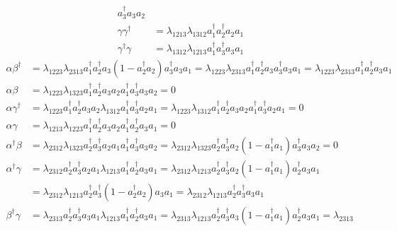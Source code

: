 \documentclass[aps,preprint]{revtex4}%
\begin{document}
\begin{itemize}
\begin{align}
a_{3}^{\dagger}a_{3}a_{2}\nonumber\\
\gamma\gamma^{\dagger}  &  =\lambda_{1213}\lambda_{1312}a_{1}^{\dagger}%
a_{2}^{\dagger}a_{2}a_{1}\nonumber\\
\gamma^{\dagger}\gamma &  =\lambda_{1312}\lambda_{1213}a_{1}^{\dagger}%
a_{3}^{\dagger}a_{3}a_{1}%
\end{align}%
\begin{align}
\alpha\beta^{\dagger}  &  =\lambda_{1223}\lambda_{2313}a_{1}^{\dagger}%
a_{2}^{\dagger}a_{3}\left(  1-a_{2}^{\dagger}a_{2}\right)  a_{3}^{\dagger
}a_{3}a_{1}=\lambda_{1223}\lambda_{2313}a_{1}^{\dagger}a_{2}^{\dagger}%
a_{3}a_{3}^{\dagger}a_{3}a_{1}=\lambda_{1223}\lambda_{2313}a_{1}^{\dagger
}a_{2}^{\dagger}a_{3}a_{1}\nonumber\\
\alpha\beta &  =\lambda_{1223}\lambda_{1323}a_{1}^{\dagger}a_{2}^{\dagger
}a_{3}a_{2}a_{1}^{\dagger}a_{3}^{\dagger}a_{3}a_{2}=0\nonumber\\
\alpha\gamma^{\dagger}  &  =\lambda_{1223}a_{1}^{\dagger}a_{2}^{\dagger}%
a_{3}a_{2}\lambda_{1312}a_{1}^{\dagger}a_{3}^{\dagger}a_{2}a_{1}%
=\lambda_{1223}\lambda_{1312}a_{1}^{\dagger}a_{2}^{\dagger}a_{3}a_{2}%
a_{1}^{\dagger}a_{3}^{\dagger}a_{2}a_{1}=0\nonumber\\
\alpha\gamma &  =\lambda_{1213}\lambda_{1223}a_{1}^{\dagger}a_{2}^{\dagger
}a_{3}a_{2}a_{1}^{\dagger}a_{2}^{\dagger}a_{3}a_{1}=0\nonumber\\
\alpha^{\dagger}\beta &  =\lambda_{2312}\lambda_{1323}a_{2}^{\dagger}%
a_{3}^{\dagger}a_{2}a_{1}a_{1}^{\dagger}a_{3}^{\dagger}a_{3}a_{2}%
=\lambda_{2312}\lambda_{1323}a_{2}^{\dagger}a_{3}^{\dagger}a_{2}\left(
1-a_{1}^{\dagger}a_{1}\right)  a_{3}^{\dagger}a_{3}a_{2}=0\nonumber\\
\alpha^{\dagger}\gamma &  =\lambda_{2312}a_{2}^{\dagger}a_{3}^{\dagger}%
a_{2}a_{1}\lambda_{1213}a_{1}^{\dagger}a_{2}^{\dagger}a_{3}a_{1}%
=\lambda_{2312}\lambda_{1213}a_{2}^{\dagger}a_{3}^{\dagger}a_{2}\left(
1-a_{1}^{\dagger}a_{1}\right)  a_{2}^{\dagger}a_{3}a_{1}\nonumber\\
&  =\lambda_{2312}\lambda_{1213}a_{2}^{\dagger}a_{3}^{\dagger}\left(
1-a_{2}^{\dagger}a_{2}\right)  a_{3}a_{1}=\lambda_{2312}\lambda_{1213}%
a_{2}^{\dagger}a_{3}^{\dagger}a_{3}a_{1}\\
\beta^{\dagger}\gamma &  =\lambda_{2313}a_{2}^{\dagger}a_{3}^{\dagger}%
a_{3}a_{1}\lambda_{1213}a_{1}^{\dagger}a_{2}^{\dagger}a_{3}a_{1}%
=\lambda_{2313}\lambda_{1213}a_{2}^{\dagger}a_{3}^{\dagger}a_{3}\left(
1-a_{1}^{\dagger}a_{1}\right)  a_{2}^{\dagger}a_{3}a_{1}=\lambda_{2313}%

\end{align}
\end{itemize}
\end{document}

